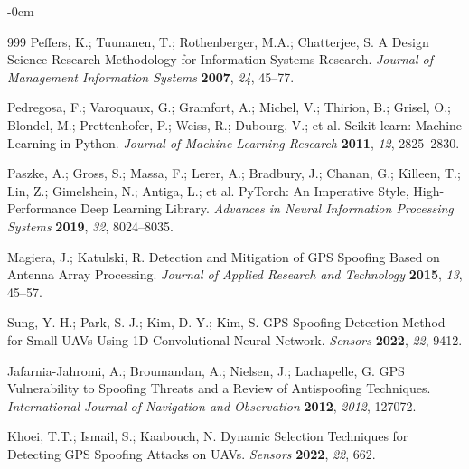 \documentclass[electronics,article,accept,moreauthors]{Definitions/mdpi}
\begin{document}
\begin{adjustwidth}{-\extralength}{0cm}
\begin{thebibliography}{999}
Peffers, K.; Tuunanen, T.; Rothenberger, M.A.; Chatterjee, S. A Design Science Research Methodology for Information Systems Research. \textit{Journal of Management Information Systems} \textbf{2007}, \textit{24}, 45--77.

Pedregosa, F.; Varoquaux, G.; Gramfort, A.; Michel, V.; Thirion, B.; Grisel, O.; Blondel, M.; Prettenhofer, P.; Weiss, R.; Dubourg, V.; et al. Scikit-learn: Machine Learning in Python. \textit{Journal of Machine Learning Research} \textbf{2011}, \textit{12}, 2825--2830.

Paszke, A.; Gross, S.; Massa, F.; Lerer, A.; Bradbury, J.; Chanan, G.; Killeen, T.; Lin, Z.; Gimelshein, N.; Antiga, L.; et al. PyTorch: An Imperative Style, High-Performance Deep Learning Library. \textit{Advances in Neural Information Processing Systems} \textbf{2019}, \textit{32}, 8024--8035.

Magiera, J.; Katulski, R. Detection and Mitigation of GPS Spoofing Based on Antenna Array Processing. \textit{Journal of Applied Research and Technology} \textbf{2015}, \textit{13}, 45--57.

Sung, Y.-H.; Park, S.-J.; Kim, D.-Y.; Kim, S. GPS Spoofing Detection Method for Small UAVs Using 1D Convolutional Neural Network. \textit{Sensors} \textbf{2022}, \textit{22}, 9412.

Jafarnia-Jahromi, A.; Broumandan, A.; Nielsen, J.; Lachapelle, G. GPS Vulnerability to Spoofing Threats and a Review of Antispoofing Techniques. \textit{International Journal of Navigation and Observation} \textbf{2012}, \textit{2012}, 127072.

Khoei, T.T.; Ismail, S.; Kaabouch, N. Dynamic Selection Techniques for Detecting GPS Spoofing Attacks on UAVs. \textit{Sensors} \textbf{2022}, \textit{22}, 662.

\end{thebibliography}

\end{adjustwidth}
  
\PublishersNote{}
\end{document}
